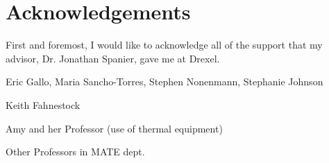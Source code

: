 \chapter*{Acknowledgements}


First and foremost, I would like to acknowledge all of the support that my advisor, Dr. Jonathan Spanier, gave me at Drexel. 

Eric Gallo, Maria Sancho-Torres, Stephen Nonenmann, Stephanie Johnson

Keith Fahnestock

Amy and her Professor (use of thermal equipment)

Other Professors in MATE dept. 
